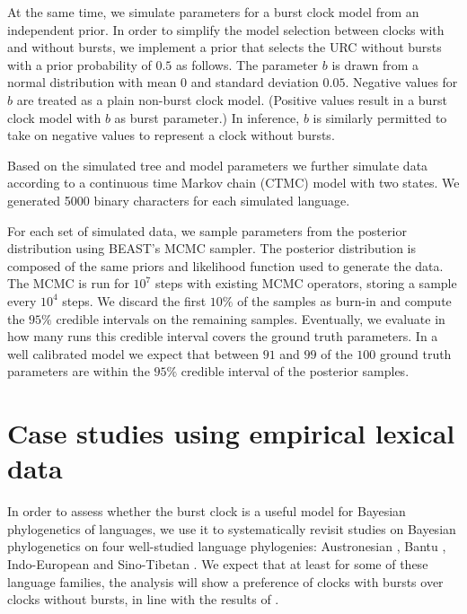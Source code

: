 \documentclass[]{rsos}%
\begin{document}
At the same time, we simulate parameters for a burst clock model from an independent prior. In order to simplify the model selection between clocks with and without bursts, we implement a prior that selects the URC without bursts with a prior probability of $0.5$ as follows. The parameter $b$ is drawn from a normal distribution with mean $0$ and standard deviation $0.05$. Negative values for $b$ are treated as a plain non-burst clock model. (Positive values result in a burst clock model with $b$ as burst parameter.) In inference, $b$ is similarly permitted to take on negative values to represent a clock without bursts.

Based on the simulated tree and model parameters we further simulate data according to a continuous time Markov chain (CTMC) model with two states. We generated 5000 binary characters for each simulated language.

For each set of simulated data, we sample parameters from the posterior distribution using BEAST's MCMC sampler. The posterior distribution is composed of the same priors and likelihood function used to generate the data.
The MCMC is run for $10^7$ steps with existing MCMC operators, storing a sample every $10^4$ steps. We discard the first $10\%$ of the samples as burn-in and compute the $95\%$ credible intervals on the remaining samples. Eventually, we evaluate in how many runs this credible interval covers the ground truth parameters. In a well calibrated model we expect that between $91$ and $99$ of the $100$ ground truth parameters are within the $95\%$ credible interval of the posterior samples.

\section{Case studies using empirical lexical data}
\label{s:lexical}

In order to assess whether the burst clock is a useful model for Bayesian
phylogenetics of languages, we use it to systematically revisit studies on Bayesian phylogenetics
on four well-studied language phylogenies:
Austronesian
\parencite{gray2009language,greenhill2017evolutionary,greenhill2018population},
Bantu
\parencite{grollemund2015bantu,greenhill2018population,currie2013cultural},
Indo-European
\parencite{bouckaert2012mapping,chang2015ancestryconstrained,gray2003language,holm2017steppe,rama2018three,willems2016using}
and
Sino-Tibetan \parencite{sagart2019dated,zhang2019phylogenetic}.
We expect that at least for some of these language families, the analysis will show
a preference of clocks with bursts over clocks without bursts,
in line with the results of \textcite{atkinson2008languages}.
\end{document}
